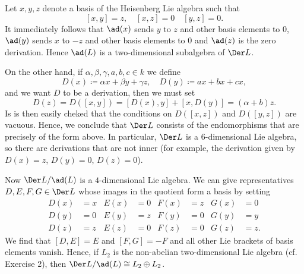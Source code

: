 Let $x, y, z$ denote a basis of the Heisenberg Lie algebra such that
\[ [x, y] = z,\quad [x, z] = 0\quad [y, z] = 0. \]
It immediately follows that $\ad(x)$ sends $y$ to $z$ and other basis elements
to $0$, $\ad(y)$ sends $x$ to $-z$ and other basis elements to $0$ and $\ad(z)$
is the zero derivation. Hence $\ad(L)$ is a two-dimensional subalgebra of
$\Der L$.

On the other hand, if $\alpha, \beta, \gamma, a, b, c \in k$ we define
\[ D(x) \coloneqq \alpha x + \beta y + \gamma z,\quad D(y)\coloneqq ax + bx + cx, \]
and we want $D$ to be a derivation, then we must set
\[ D(z) = D([x, y]) = [D(x), y] + [x, D(y)] = (\alpha + b)z. \]
Is is then easily cheked that the conditions on $D([x, z])$ and $D([y, z])$
are vacuous. Hence, we conclude that $\Der L$ consists of the endomorphisms that
are precisely of the form above. In particular, $\Der L$ is a 6-dimensional Lie
algebra, so there are derivations that are not inner (for example, the derivation
given by $D(x) = z$,  $D(y) = 0$, $D(z) = 0$).

Now $\Der L/\ad(L)$ is a $4$-dimensional Lie algebra. We can give representatives
$D, E, F, G \in \Der L$ whose images in the quotient form a basis by setting
\begin{align*}
	D(x) &= x & E(x) &= 0 & F(x) &= z & G(x) &= 0\\
	D(y) &= 0 & E(y) &= z & F(y) &= 0 & G(y) &= y\\
	D(z) &= z & E(z) &= 0 & F(z) &= 0 & G(z) &= z.
\end{align*}
We find that $[D, E] = E$ and $[F, G] = -F$ and all other Lie brackets of basis
elements vanish. Hence, if $L_2$ is the non-abelian
two-dimensional Lie algebra (cf. Exercise 2), then $\Der L/\ad(L) \cong L_2 \oplus L_2$.
